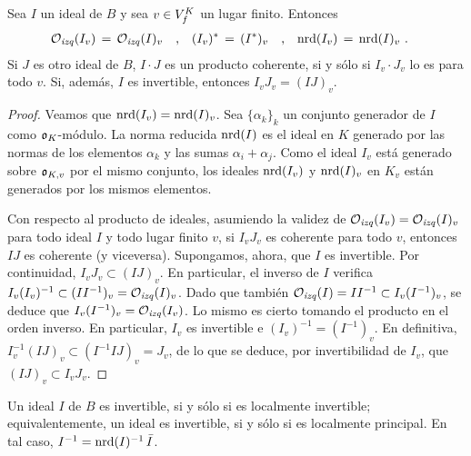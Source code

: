 \begin{propoAlgunasOperacionesLocales}\label{propo:algunasoperacioneslocales}
	Sea $I$ un ideal de $B$ y sea $v\in\lugares[f]{K}$ un lugar finito.
	Entonces
	\begin{align*}
		\Oizq(I_{v}) \,=\,\Oizq(I)_{v} & \quad\text{,}\quad
			\dual{(I_{v})}\,=\,(\dual{I})_{v}\quad\text{,}\quad
			\nrd(I_{v})\,=\,\nrd(I)_{v}
		\text{ .}
	\end{align*}
	Si $J$ es otro ideal de $B$, $I\cdot J$ es un producto coherente, si y
	s\'{o}lo si $I_{v}\cdot J_{v}$ lo es para todo $v$. Si, adem\'{a}s, $I$
	es invertible, entonces $I_{v}J_{v}=(IJ)_{v}$.
\end{propoAlgunasOperacionesLocales}

\begin{proof}
	Veamos que $\nrd(I_{v})=\nrd(I)_{v}$. Sea $\{\alpha_{k}\}_{k}$ un
	conjunto generador de $I$ como $\oka{K}$-m\'{o}dulo. La norma reducida
	$\nrd(I)$ es el ideal en $K$ generado por las normas de los elementos
	$\alpha_{k}$ y las sumas $\alpha_{i}+\alpha_{j}$. Como el ideal $I_{v}$
	est\'{a} generado sobre $\oka{K,v}$ por el mismo conjunto, los ideales
	$\nrd(I_{v})$ y $\nrd(I)_{v}$ en $K_{v}$ est\'{a}n generados por los
	mismos elementos.

	Con respecto al producto de ideales, asumiendo la validez de
	$\Oizq(I_{v})=\Oizq(I)_{v}$ para todo ideal $I$ y todo lugar finito
	$v$, si $I_{v}J_{v}$ es coherente para todo $v$, entonces $IJ$ es
	coherente (y viceversa). Supongamos, ahora, que $I$ es invertible. Por
	continuidad, $I_{v}J_{v}\subset(IJ)_{v}$. En particular, el inverso de
	$I$ verifica $I_{v}(I_{v})^{-1}\subset(II^{-1})_{v}=\Oizq(I)_{v}$.
	Dado que tambi\'{e}n $\Oizq(I)=II^{-1}\subset I_{v}(I^{-1})_{v}$, se
	deduce que $I_{v}(I^{-1})_{v}=\Oizq(I_{v})$. Lo mismo es cierto tomando
	el producto en el orden inverso. En particular, $I_{v}$ es invertible e
	$(I_{v})^{-1}=(I^{-1})_{v}$. En definitiva,
	$I_{v}^{-1}(IJ)_{v}\subset (I^{-1}IJ)_{v}=J_{v}$, de lo que se deduce,
	por invertibilidad de $I_{v}$, que $(IJ)_{v}\subset I_{v}J_{v}$.
\end{proof}

\begin{coroLocalmenteInvertibleEsInvertible}%
	\label{coro:localmenteinvertibleesinvertible}
	Un ideal $I$ de $B$ es invertible, si y s\'{o}lo si es localmente
	invertible; equivalentemente, un ideal es invertible, si y s\'{o}lo si
	es localmente principal. En tal caso, $I^{-1}=\nrd(I)^{-1}\,\conj{I}$.
\end{coroLocalmenteInvertibleEsInvertible}

